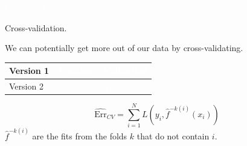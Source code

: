 \documentclass[xcolor={table}, handout]{beamer}
\begin{document}

\begin{transitionframe}
\centering

\LARGE \textcolor{white}{Cross-validation.}

\end{transitionframe}
\begin{frame}{Cross-validation.}

\begin{wideitemize}
\item We can potentially get more out of our data by cross-validating.
\end{wideitemize}

\begin{table}[]
\renewcommand{\arraystretch}{2.5}
\begin{tabular}{l >{\centering\arraybackslash}p{4cm}|>{\centering\arraybackslash}p{4cm} }
Version 1 & \cellcolor{Contrast1l} \textcolor{white}{Training} & \cellcolor{Contrast4l} \textcolor{white}{Validation} \\
\hline
Version 2 & \cellcolor{Contrast4l} \textcolor{white}{Validation} & \cellcolor{Contrast1l} \textcolor{white}{Training} \\
\end{tabular}
\end{table}
\pause

\[
\widehat{\textrm{Err}}_{CV} = \sum_{i = 1}^N L\left(y_i, \hat{f}^{-k(i)}(x_i) \right)
\]
$\hat{f}^{-k(i)}$ are the fits from the folds $k$ that do not contain $i$. 

\end{frame}



\end{document}
